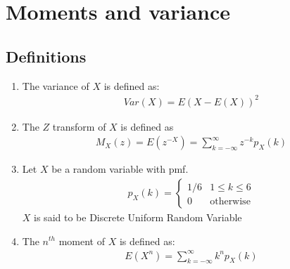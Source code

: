 \documentclass[journal,12pt,onecolumn]{IEEEtran}
\renewcommand\thesection{\arabic{section}}
\renewcommand\thesubsection{\thesection.\arabic{subsection}}
\providecommand{\sbrak}[1]{\ensuremath{{}\left[#1\right]}}
\providecommand{\brak}[1]{\ensuremath{\left(#1\right)}}
\theoremstyle{remark}
\numberwithin{equation}{section}
\begin{document}
\section{Moments and variance}
\subsection{Definitions}
\begin{enumerate}[label=\arabic*.,ref=\thesubsection.\theenumi]
%
\item 
The variance of $X$ is defined as: \begin{align}
Var({X}) = E({X}-E({X}))^2
\end{align}
\item The $Z$ transform of $X$ is defined as 
	\begin{align}
	M_X(z)=E\brak{z^{-X}} = \sum_{k = -\infty}^{\infty}z^{-k}p_X(k)
	\end{align}
\item Let $X$ be a random variable with pmf. 
\begin{align}
    p_X(k) =
    \begin{cases}
1/6 & 1 \le k \le 6
\\
0 & \text{otherwise}
    \end{cases}
\end{align}
$X$ is said to be Discrete Uniform Random Variable
\item The $n^{th}$ moment of $X$ is defined as: 
\begin{align}
E({X^n}) = \sum_{k = -\infty}^{\infty}k^{n}p_X(k)
\end{align}

\end{enumerate}
\end{document}
